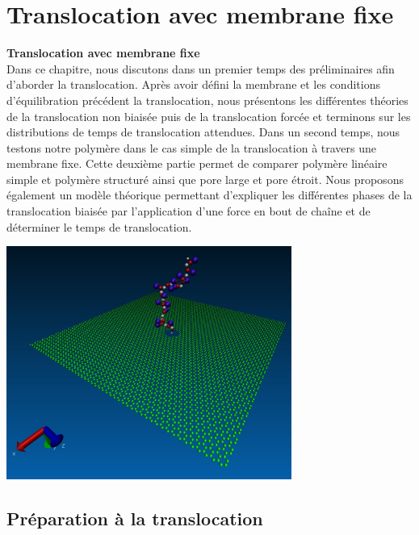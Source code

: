 
\chapter{Translocation avec membrane fixe}
\label{translocmurfixe}
\cleardoublepage
{\Large\textbf{Translocation avec membrane fixe}
}\\

\lettrine[loversize=0.6,lraise=0.1,findent=0.5em,nindent=0em]{D}{}ans ce chapitre, nous discutons dans un premier temps des préliminaires afin d'aborder la translocation. Après avoir défini la membrane et les conditions d'équilibration précédent la translocation, nous présentons les différentes théories de la translocation non biaisée puis de la translocation forcée et terminons sur les distributions de temps de translocation attendues. Dans un second temps, nous testons notre polymère dans le cas simple de la translocation à travers une membrane fixe. Cette deuxième partie permet de comparer polymère linéaire simple et polymère structuré ainsi que pore large et pore étroit. Nous proposons également un modèle théorique permettant d'expliquer les différentes phases de la translocation biaisée par l'application d'une force en bout de chaîne et de déterminer le temps de translocation.\\

\minitoc

\begin{center}
\includegraphics[width=0.7\textwidth]{confinit.jpg}
\end{center}



\cleardoublepage








\section{Préparation à la translocation}

